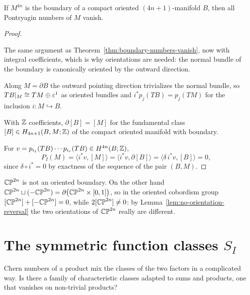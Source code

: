 \begin{lemma}\label{lem:pontryagin-boundary}
If $M^{4n}$ is the boundary of a compact oriented $(4n+1)$-manifold $B$, then
all Pontryagin numbers of $M$ vanish.
\end{lemma}

\begin{proof}
\begin{strategy}
The same argument as Theorem~\ref{thm:boundary-numbers-vanish}, now with
integral coefficients, which is why orientations are needed: the normal bundle
of the boundary is canonically oriented by the outward direction.
\end{strategy}

 Along $M=\partial B$ the outward pointing direction trivializes the
normal bundle, so $TB|_M\cong TM\oplus\varepsilon^1$ as oriented bundles and
$i^*p_j(TB)=p_j(TM)$ for the inclusion $i\colon M\hookrightarrow B$.

 With $\mathbb{Z}$ coefficients, $\partial[B]=[M]$ for the fundamental class
$[B]\in H_{4n+1}(B,M;\mathbb{Z})$ of the compact oriented manifold with boundary.

 For $v=p_{i_1}(TB)\cdots p_{i_r}(TB)\in H^{4n}(B;\mathbb{Z})$,
\[
P_I(M)=\big\langle i^*v,[M]\big\rangle
=\big\langle i^*v,\partial[B]\big\rangle
=\big\langle\delta\,i^*v,[B]\big\rangle=0,
\]
since $\delta\circ i^*=0$ by exactness of the sequence of the pair $(B,M)$.
\end{proof}

\begin{example}
$\mathbb{CP}^{2n}$ is not an oriented boundary. On the other hand
$\mathbb{CP}^{2n}\sqcup(-\mathbb{CP}^{2n})=\partial\big(\mathbb{CP}^{2n}\times[0,1]\big)$, so in the
oriented cobordism group $[\mathbb{CP}^{2n}]+[-\mathbb{CP}^{2n}]=0$, while
$2[\mathbb{CP}^{2n}]\neq0$: by Lemma~\ref{lem:no-orientation-reversal} the two
orientations of $\mathbb{CP}^{2n}$ really are different.
\end{example}
\section[The symmetric function classes SI]{\texorpdfstring{The symmetric function classes $S_I$}{The symmetric function classes SI}}


\begin{guiding}
Chern numbers of a product mix the classes of the two factors in a complicated
way. Is there a family of characteristic classes adapted to sums and products,
one that vanishes on non-trivial products?
\end{guiding}

